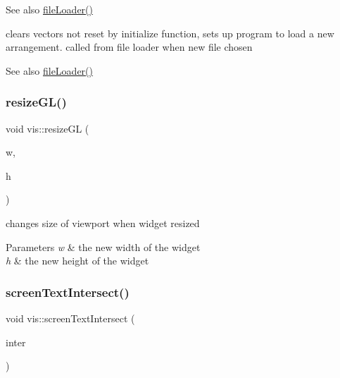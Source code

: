 \begin{DoxySeeAlso}{See also}
\mbox{\hyperlink{classvis_a2886cfbc9070b5622347b1c6c87dfe18}{file\+Loader()}}
\end{DoxySeeAlso}
clears vectors not reset by initialize function, sets up program to load a new arrangement. called from file loader when new file chosen

\begin{DoxySeeAlso}{See also}
\mbox{\hyperlink{classvis_a2886cfbc9070b5622347b1c6c87dfe18}{file\+Loader()}} 
\end{DoxySeeAlso}
\mbox{\label{classvis_af1b4cd445e1f1728eae264fcc6652ed7}} 
\subsubsection{\texorpdfstring{resize\+G\+L()}{resizeGL()}}
{\footnotesize\ttfamily void vis\+::resize\+GL (\begin{DoxyParamCaption}\item[{int}]{w,  }\item[{int}]{h }\end{DoxyParamCaption})\hspace{0.3cm}{\ttfamily [protected]}}

changes size of viewport when widget resized


\begin{DoxyParams}{Parameters}
{\em w} & the new width of the widget \\
\hline
{\em h} & the new height of the widget \\
\hline
\end{DoxyParams}
\mbox{\label{classvis_a14c9c1ba23785bc482c78c05c025ca84}} 
\subsubsection{\texorpdfstring{screen\+Text\+Intersect()}{screenTextIntersect()}}
{\footnotesize\ttfamily void vis\+::screen\+Text\+Intersect (\begin{DoxyParamCaption}\item[{\mbox{\hyperlink{structint_draw}{int\+Draw}}}]{inter }\end{DoxyParamCaption})}

